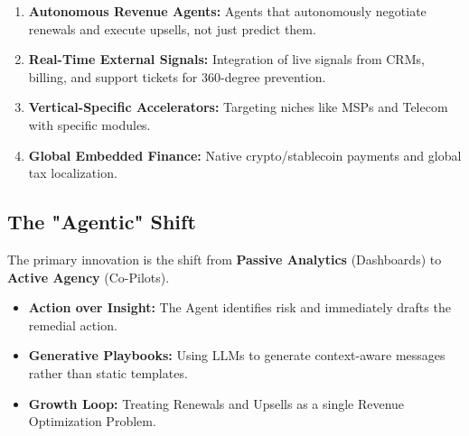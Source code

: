 \documentclass[12pt,a4paper]{article}
\begin{document}
\begin{enumerate}
    \item \textbf{Autonomous Revenue Agents:} Agents that autonomously negotiate renewals and execute upsells, not just predict them.
    \item \textbf{Real-Time External Signals:} Integration of live signals from CRMs, billing, and support tickets for 360-degree prevention.
    \item \textbf{Vertical-Specific Accelerators:} Targeting niches like MSPs and Telecom with specific modules.
    \item \textbf{Global Embedded Finance:} Native crypto/stablecoin payments and global tax localization.
\end{enumerate}

\subsection{The "Agentic" Shift}
The primary innovation is the shift from \textbf{Passive Analytics} (Dashboards) to \textbf{Active Agency} (Co-Pilots).
\begin{itemize}
    \item \textbf{Action over Insight:} The Agent identifies risk and immediately drafts the remedial action.
    \item \textbf{Generative Playbooks:} Using LLMs to generate context-aware messages rather than static templates.
    \item \textbf{Growth Loop:} Treating Renewals and Upsells as a single Revenue Optimization Problem.
\end{itemize}
\end{document}
